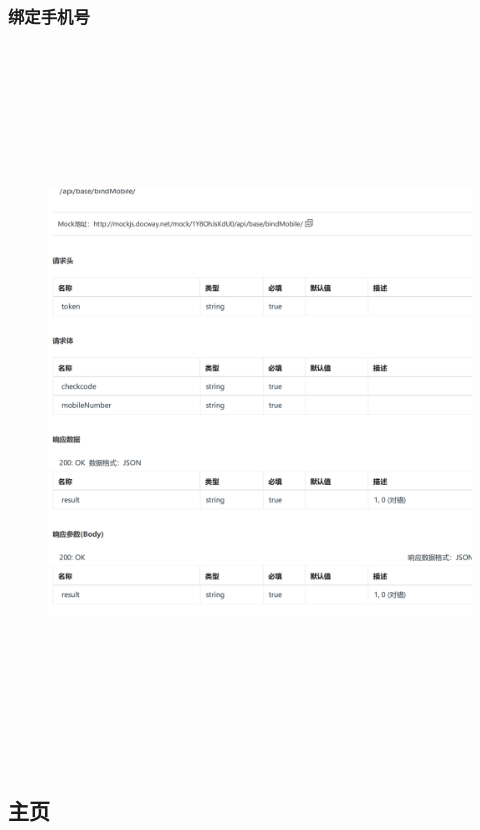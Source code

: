         \subsubsection{绑定手机号}
        \begin{figure}[h]
            \centering
            \includegraphics[height=19.0cm,width=14.0cm]{design/image/api3.png} 
            \end{figure}        
            \newpage  
\subsection{主页}
